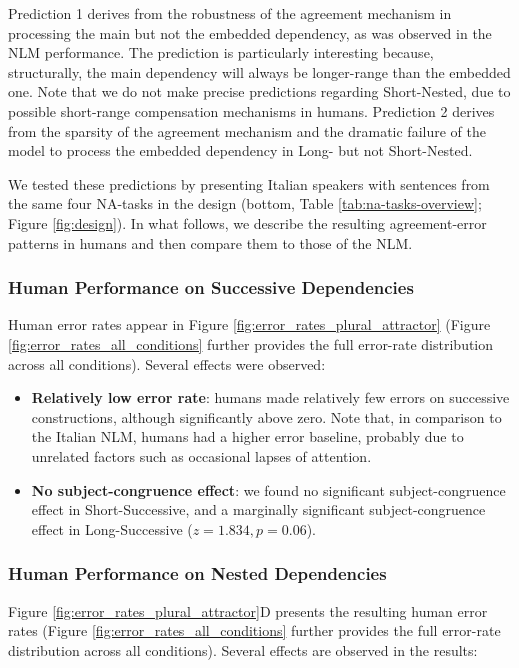 Prediction 1 derives from the robustness of the agreement mechanism in processing the main but not the embedded dependency, as was observed in the NLM performance. The prediction is particularly interesting because, structurally, the main dependency will always be longer-range than the embedded one. Note that we do not make precise predictions regarding Short-Nested, due to possible short-range compensation mechanisms in humans. Prediction 2 derives from the sparsity of the agreement mechanism and the dramatic failure of the model to process the embedded dependency in Long- but not Short-Nested. 

We tested these predictions by presenting Italian speakers with sentences from the same four NA-tasks in the design (bottom, Table \ref{tab:na-tasks-overview}; Figure \ref{fig:design}). In what follows, we describe the resulting agreement-error patterns in humans and then compare them to those of the NLM.

\subsubsection{Human Performance on Successive Dependencies}
Human error rates appear in Figure \ref{fig:error_rates_plural_attractor}  (Figure \ref{fig:error_rates_all_conditions} further provides the full error-rate distribution across all conditions). Several effects were observed: 

\begin{itemize}
    \item \textbf{Relatively low error rate}: humans made relatively few errors on successive constructions, although significantly above zero. Note that, in comparison to the Italian NLM, humans had a higher error baseline, probably due to unrelated factors such as occasional lapses of attention.
    \item \textbf{No subject-congruence effect}: we found no significant subject-congruence effect in Short-Successive, and a marginally significant subject-congruence effect in Long-Successive ($z=1.834, p=0.06$).
\end{itemize}

\subsubsection{Human Performance on Nested Dependencies}
Figure \ref{fig:error_rates_plural_attractor}D presents the resulting human error rates (Figure \ref{fig:error_rates_all_conditions} further provides the full error-rate distribution across all conditions). Several effects are observed in the results:


